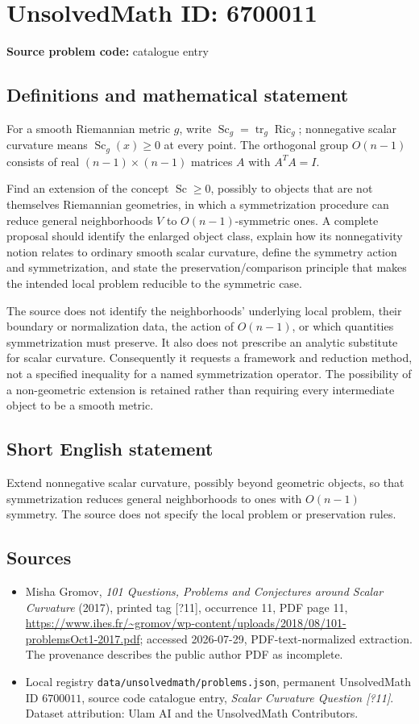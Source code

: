 \documentclass[11pt]{article}
\begin{document}
\section*{UnsolvedMath ID: 6700011}
\textbf{Source problem code:} catalogue entry
\subsection{Definitions and mathematical statement}
For a smooth Riemannian metric $g$, write $\operatorname{Sc}_g=\operatorname{tr}_g\operatorname{Ric}_g$; nonnegative scalar curvature means $\operatorname{Sc}_g(x)\geq0$ at every point. The orthogonal group $O(n-1)$ consists of real $(n-1)\times(n-1)$ matrices $A$ with $A^TA=I$.

Find an extension of the concept $\operatorname{Sc}\geq0$, possibly to objects that are not themselves Riemannian geometries, in which a symmetrization procedure can reduce general neighborhoods $V$ to $O(n-1)$-symmetric ones. A complete proposal should identify the enlarged object class, explain how its nonnegativity notion relates to ordinary smooth scalar curvature, define the symmetry action and symmetrization, and state the preservation/comparison principle that makes the intended local problem reducible to the symmetric case.

The source does not identify the neighborhoods' underlying local problem, their boundary or normalization data, the action of $O(n-1)$, or which quantities symmetrization must preserve. It also does not prescribe an analytic substitute for scalar curvature. Consequently it requests a framework and reduction method, not a specified inequality for a named symmetrization operator. The possibility of a non-geometric extension is retained rather than requiring every intermediate object to be a smooth metric.
\subsection{Short English statement}
Extend nonnegative scalar curvature, possibly beyond geometric objects, so that symmetrization reduces general neighborhoods to ones with $O(n-1)$ symmetry. The source does not specify the local problem or preservation rules.
\subsection{Sources}
\begin{itemize}
\item Misha Gromov, \emph{101 Questions, Problems and Conjectures around Scalar Curvature} (2017), printed tag [?11], occurrence 11, PDF page 11, \url{https://www.ihes.fr/~gromov/wp-content/uploads/2018/08/101-problemsOct1-2017.pdf}; accessed 2026-07-29, PDF-text-normalized extraction. The provenance describes the public author PDF as incomplete.
\item Local registry \texttt{data/unsolvedmath/problems.json}, permanent UnsolvedMath ID $6700011$, source code catalogue entry, \emph{Scalar Curvature Question [?11]}. Dataset attribution: Ulam AI and the UnsolvedMath Contributors.
\end{itemize}
\end{document}
